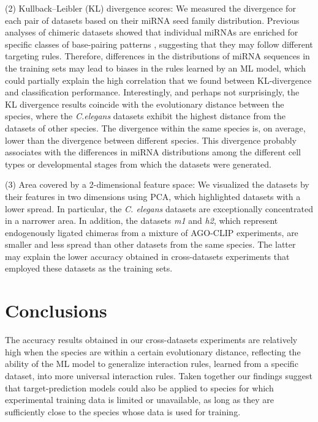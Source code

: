 \documentclass{bmcart}
\begin{document}
(2) Kullback–Leibler (KL) divergence scores: We measured the divergence for each pair of datasets based on their miRNA seed family distribution. Previous analyses of chimeric datasets showed that individual miRNAs are enriched for specific classes of base-pairing patterns \cite{helwak2013mapping, broughton2016pairing}, suggesting that they may follow different targeting rules.
Therefore, differences in the distributions of miRNA sequences in the training sets may lead to biases in the rules learned by an ML model, which could partially explain the high correlation that we found between KL-divergence and classification performance.  
Interestingly, and perhaps not surprisingly, the KL divergence results coincide with the evolutionary distance between the species, where the \textit{C.elegans} datasets exhibit the highest distance from the datasets of other species. The divergence within the same species is, on average, lower than the divergence between different species. This divergence probably associates with the differences in miRNA distributions among the different cell types or developmental stages from which the datasets were generated. 

(3) Area covered by a 2-dimensional feature space: We visualized the datasets by their features in two dimensions using PCA, which highlighted datasets with a lower spread. In particular, the \textit{C. elegans} datasets are exceptionally concentrated in a narrower area. In addition, the datasets \textit{m1} and \textit{h2}, which represent endogenously ligated chimeras from a mixture of AGO-CLIP experiments, are smaller and less spread than other datasets from the same species. The latter may explain the lower accuracy obtained in cross-datasets experiments that employed these datasets as the training sets.


\section*{Conclusions}
The accuracy results obtained in our cross-datasets experiments are relatively high when the species are within a certain evolutionary distance, reflecting the ability of the ML model to generalize interaction rules, learned from a specific dataset, into more universal interaction rules. Taken together our findings suggest that target-prediction models could also be applied to species for which experimental training data is limited or unavailable, as long as they are sufficiently close to the species whose data is used for training.
\end{document}
